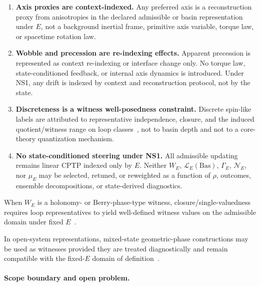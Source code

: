 \documentclass[aps,prx,onecolumn,11pt]{revtex4-2}
\theoremstyle{plain}
\theoremstyle{definition}
\theoremstyle{remark}
\begin{document}
\begin{enumerate}[label=(\roman*), leftmargin=2.2em]

\item \textbf{Axis proxies are context-indexed.}
Any preferred axis is a reconstruction proxy from anisotropies in the
declared admissible or basin representation under \(E\), not a
background inertial frame, primitive axis variable, torque law, or
spacetime rotation law.

\item \textbf{Wobble and precession are re-indexing effects.}
Apparent precession is represented as context re-indexing or interface
change only. No torque law, state-conditioned feedback, or internal
axis dynamics is introduced. Under NS1, any drift is indexed by context
and reconstruction protocol, not by the state.

\item \textbf{Discreteness is a witness well-posedness constraint.}
Discrete spin-like labels are attributed to representative independence,
closure, and the induced quotient/witness range on loop
classes~\cite{Simon1983,Berry1984,WilczekZee1984,Nakahara2003}, not to
basin depth and not to a core-theory quantization mechanism.

\item \textbf{No state-conditioned steering under NS1.}
All admissible updating remains linear CPTP indexed only by \(E\).
Neither \(W_E\), \(\mathcal L_E(\mathrm{Bas})\), \(\Gamma_E\),
\(\mathcal N_E\), nor \(\mu_E\) may be selected, retuned, or reweighted
as a function of \(\rho\), outcomes, ensemble decompositions, or
state-derived diagnostics.

\end{enumerate}

When \(W_E\) is a holonomy- or Berry-phase-type witness,
closure/single-valuedness requires loop representatives to yield
well-defined witness values on the admissible domain under fixed
\(E\)~\cite{Simon1983,Berry1984,AharonovAnandan1987,Nakahara2003}.

In open-system representations, mixed-state geometric-phase
constructions may be used as witnesses provided they are treated
diagnostically and remain compatible with the fixed-\(E\)
domain of definition~\cite{Sjoqvist2000,Tong2004}.

\paragraph{Scope boundary and open problem.}
\end{document}
